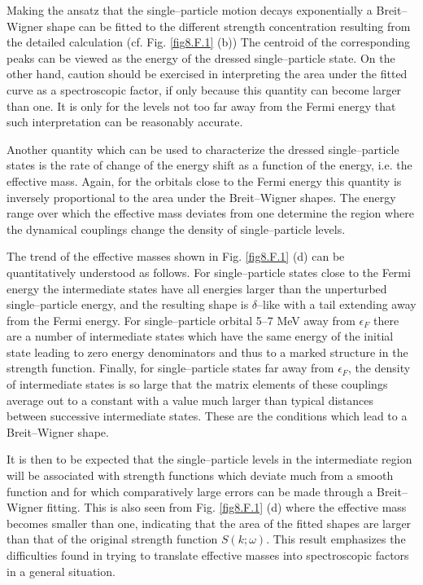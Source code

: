 \begin{subappendices}
Making the ansatz that the single--particle motion decays exponentially a Breit--Wigner shape can be fitted to the different strength concentration resulting from the detailed calculation (cf. Fig. \ref{fig8.F.1} (b)) The centroid of the corresponding peaks can be viewed as the energy of the dressed single--particle state. On the other hand, caution should be exercised in interpreting the area under the fitted curve as a spectroscopic factor, if only because this quantity can become larger than one. It is only for the levels not too far away from the Fermi energy that such interpretation can   be reasonably accurate.


Another quantity which can be used to characterize the dressed single--particle states is the rate of change of the energy shift as a function of the energy, i.e. the effective mass. Again, for the orbitals close to the Fermi energy this quantity is inversely proportional to the area under the Breit--Wigner shapes. The energy range over which the effective mass deviates from one determine the region where the dynamical couplings change the density of single--particle levels.



The trend of the effective masses shown in Fig. \ref{fig8.F.1} (d) can be quantitatively understood as follows. For single--particle states close to the Fermi energy the intermediate states have all energies larger than the unperturbed single--particle energy, and the resulting shape is $\delta$--like with a tail extending away from the Fermi energy. For single--particle orbital 5--7 MeV away from $\epsilon_F$ there are a number of intermediate states which have the same energy of the initial state leading to zero energy denominators and thus to a marked structure in the strength function. Finally, for single--particle states far away from $\epsilon_F$, the density of intermediate states is so large that the matrix elements of these couplings average out to a constant with a value much larger than typical distances between successive intermediate states. These are the conditions which lead to a Breit--Wigner shape.  


It is then to be expected that the single--particle levels in the intermediate region will be associated with strength functions which deviate much from a smooth function and for which comparatively large errors can be made through a Breit--Wigner fitting. This is also seen from Fig. \ref{fig8.F.1} (d) where the effective mass becomes smaller than one, indicating that the area of the fitted shapes are larger than that of the original strength function $S(k;\omega)$. This result emphasizes the difficulties found in trying to translate effective masses into spectroscopic factors in a general situation.



\end{subappendices}
